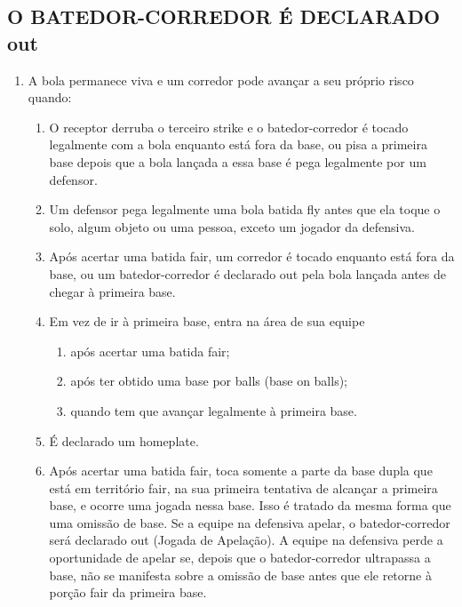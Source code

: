 \vspace{5mm}
\subsection{O BATEDOR-CORREDOR \'E DECLARADO \gls{out}} 
\begin{multicols}{2}
	\begin{enumerate}[label=\alph*)]
		\item A bola permanece viva e um corredor pode avan\c{c}ar a seu pr\'oprio risco quando: 
		
		\begin{enumerate}[label=\roman*.]
			\item O receptor derruba o terceiro \gls{strike} e o batedor-corredor \'e tocado legalmente com a bola enquanto est\'a fora da base, ou pisa a primeira base 
			depois que a bola lan\c{c}ada a essa base \'e pega legalmente por um defensor. 
			\item Um defensor pega legalmente uma bola batida \gls{fly} antes que ela toque o solo, algum objeto ou uma pessoa, exceto um jogador da defensiva. 
			\item Ap\'os acertar uma batida \gls{fair}, um corredor \'e tocado enquanto est\'a fora da base, ou um batedor-corredor \'e declarado \gls{out} pela bola lan\c{c}ada antes de chegar \`a primeira base. 
			\item Em vez de ir \`a primeira base, entra na \'area de sua equipe 
			\begin{enumerate}[label=\arabic*)]
				\item ap\'os acertar uma batida \gls{fair}; 
				\item ap\'os ter obtido uma base por \glspl{ball} (\gls{base on balls}); 
				\item quando tem que avan\c{c}ar legalmente \`a primeira base. 
			\end{enumerate}
			\item \'E declarado um \gls{homeplate}. 
			\item Ap\'os acertar uma batida \gls{fair}, toca somente a parte da base dupla que est\'a em territ\'orio \gls{fair}, na sua primeira tentativa de alcan\c{c}ar a primeira base, e ocorre uma jogada nessa base. Isso \'e tratado da mesma forma que uma omiss\~ao de base. Se a equipe na defensiva apelar, o batedor-corredor ser\'a declarado \gls{out} (Jogada de Apela\c{c}\~ao). A equipe na defensiva perde a oportunidade de apelar se, depois que o batedor-corredor ultrapassa a base, n\~ao se manifesta sobre a omiss\~ao de base antes que ele retorne \`a por\c{c}\~ao \gls{fair} da primeira base. 

\end{enumerate}
\end{enumerate}
\end{multicols}
